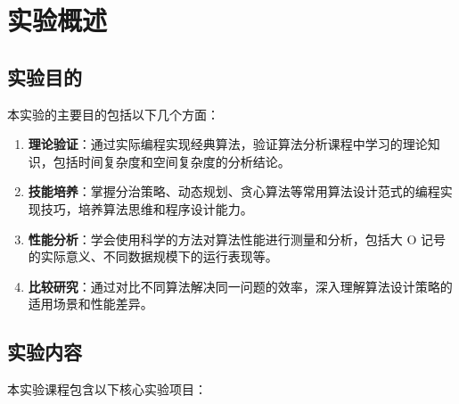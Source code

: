 \documentclass[12pt,a4paper,UTF8]{article}
\begin{document}
\newpage
\section{实验概述}

\subsection{实验目的}

本实验的主要目的包括以下几个方面：

\begin{enumerate}[label=(\arabic*)]
    \item \textbf{理论验证}：通过实际编程实现经典算法，验证算法分析课程中学习的理论知识，包括时间复杂度和空间复杂度的分析结论。

    \item \textbf{技能培养}：掌握分治策略、动态规划、贪心算法等常用算法设计范式的编程实现技巧，培养算法思维和程序设计能力。

    \item \textbf{性能分析}：学会使用科学的方法对算法性能进行测量和分析，包括大 O 记号的实际意义、不同数据规模下的运行表现等。

    \item \textbf{比较研究}：通过对比不同算法解决同一问题的效率，深入理解算法设计策略的适用场景和性能差异。
\end{enumerate}

\subsection{实验内容}

本实验课程包含以下核心实验项目：
\end{document}
